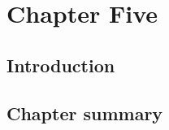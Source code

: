 %
%
\chapter{Chapter Five} \label{chap:five}

\section{Introduction} \label{sec:intro}


\section{Chapter summary}


